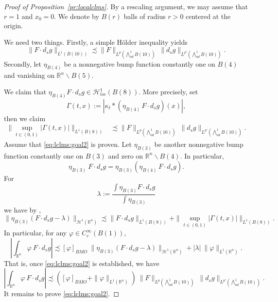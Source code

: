 \documentclass[12pt]{amsart}
\theoremstyle{definition}
\newcommand{\R}{\mathbb{R}}
\newcommand{\brac}[1]{\left (#1 \right )}
\newcommand{\Ep}{\bigwedge\nolimits}
\numberwithin{theorem}{section} \numberwithin{equation}{section}
\newcommand{\aleq}{\precsim}
\begin{document}
\begin{proof}[Proof of Proposition~\ref{pr:localclms}]
By a rescaling argument, we may assume that $r = 1$ and $x_0 = 0$. We denote by $B(r)$ balls of radius $r > 0$ centered at the origin.

We need two things. Firstly, a simple H\"older inequality yields
\begin{equation}\label{eq:lclms:goal1}
  \|F \cdot d_s g\|_{L^1(B(10))} \aleq \|F\|_{L^p(\Ep^1_{od} B(10))}\ \|d_s g\|_{L^{p'}(\Ep^1_{od} B(10))}. 
\end{equation}
Secondly, let $\eta_{B(4)}$ be a nonnegative bump function constantly one on $B(4)$ and vanishing on $\R^n \backslash B(5)$. 

We claim that $\eta_{B(4)} F \cdot d_s g \in \mathcal{H}^1_{loc}(B(8))$. More precisely, set
\[
 \Gamma(t,x) :=  |\kappa_t \ast (\eta_{B(4)}\, F \cdot d_s g )(x)|,
\]
then we claim
\begin{equation}\label{eq:lclms:goal2}
 \begin{split}
   \|\sup_{t \in (0,1)} |\Gamma(t,x)|\|_{L^1(B(8))} &\aleq \|F\|_{L^p(\Ep^1_{od} B(10))}\ \|d_s g\|_{L^{p'}(\Ep^1_{od} B(10))}.
 \end{split}
\end{equation}
% 
Assume that \eqref{eq:lclms:goal2} is proven. Let $\eta_{B(3)}$ be another nonnegative bump function constantly one on $B(3)$ and zero on $\R^n \backslash B(4)$. In particular,
\[
 \eta_{B(3)}\ F \cdot d_s g  = \eta_{B(3)}(\eta_{B(4)}\, F \cdot d_s g ).
\]
For
\[
 \lambda := \frac{\int \eta_{B(3)} F \cdot d_s g}{\int \eta_{B(3)}} 
\]
we have by  \cite[Proposition 1.92]{Semmes-1994},
\[
 \|\eta_{B(3)} (F \cdot d_s g - \lambda)\|_{\mathcal{H}^1(\R^n)} \aleq \|F \cdot d_s g\|_{L^1(B(8))} + \|\sup_{t \in (0,1)} |\Gamma(t,x)|\|_{L^1(B(8))}.
\]
In particular, for any $\varphi \in C_c^\infty(B(1))$, 
\[
 \left |\int_{\R^n} \varphi\ F \cdot d_s g \right | \aleq  [\varphi]_{BMO}\ \|\eta_{B(3)} (F \cdot d_s g - \lambda)\|_{\mathcal{H}^1(\R^n)} + |\lambda|\ \|\varphi\|_{L^1(\R^n)}.
\]
That is, once \eqref{eq:lclms:goal2} is established, we have
\[
 \left |\int_{\R^n} \varphi\ F \cdot d_s g \right | \aleq  \brac{[\varphi]_{BMO} + \|\varphi\|_{L^1(\R^n)}}\ \|F\|_{L^p(\Ep^1_{od} B(10))}\ \|d_s g\|_{L^{p'}(\Ep^1_{od} B(10))} .
\]
% 
%  
It remains to prove \eqref{eq:lclms:goal2}. 


\end{proof}
\end{document}
